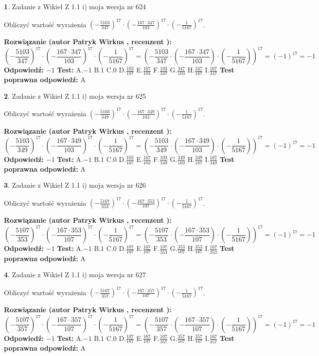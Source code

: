 \documentclass[12pt, a4paper]{article}
\theoremstyle{definition} %
\newtheorem{zad}{}
\newcommand{\zadStart}[1]{\begin{zad}#1\newline}
\newcommand{\zadStop}{\end{zad}}
\newcommand{\rozwStart}[2]{\noindent \textbf{Rozwiązanie (autor #1 , recenzent #2): }\newline}
\newcommand{\rozwStop}{\newline}
\newcommand{\odpStart}{\noindent \textbf{Odpowiedź:}\newline}
\newcommand{\odpStop}{\newline}
\newcommand{\testStart}{\noindent \textbf{Test:}\newline}
\newcommand{\testStop}{\newline}
\newcommand{\kluczStart}{\noindent \textbf{Test poprawna odpowiedź:}\newline}
\newcommand{\kluczStop}{\newline}
\begin{document}
\zadStart{Zadanie z Wikieł Z 1.1 i) moja wersja nr 624}

Obliczyć wartość wyrażenia $(-\frac{5103}{347})^{17} \cdot (-\frac{167 \cdot 347}{103})^{17} \cdot (-\frac{1}{5167})^{17}$.
\zadStop
\rozwStart{Patryk Wirkus}{}
$$(-\frac{5103}{347})^{17} \cdot (-\frac{167 \cdot 347}{103})^{17} \cdot (-\frac{1}{5167})^{17} = (-\frac{5103}{347} \cdot (-\frac{167 \cdot 347}{103}) \cdot (-\frac{1}{5167}))^{17} = (-1)^{17} = -1$$
\rozwStop
\odpStart
$-1$
\odpStop
\testStart
A.$-1$ B.$1$ C.$0$ D.$\frac{103}{167}$ E.$\frac{167}{103}$
F.$\frac{103}{347}$ G.$\frac{347}{103}$
H.$\frac{347}{167}$
I.$\frac{167}{347}$
\testStop
\kluczStart
A
\kluczStop



\zadStart{Zadanie z Wikieł Z 1.1 i) moja wersja nr 625}

Obliczyć wartość wyrażenia $(-\frac{5103}{349})^{17} \cdot (-\frac{167 \cdot 349}{103})^{17} \cdot (-\frac{1}{5167})^{17}$.
\zadStop
\rozwStart{Patryk Wirkus}{}
$$(-\frac{5103}{349})^{17} \cdot (-\frac{167 \cdot 349}{103})^{17} \cdot (-\frac{1}{5167})^{17} = (-\frac{5103}{349} \cdot (-\frac{167 \cdot 349}{103}) \cdot (-\frac{1}{5167}))^{17} = (-1)^{17} = -1$$
\rozwStop
\odpStart
$-1$
\odpStop
\testStart
A.$-1$ B.$1$ C.$0$ D.$\frac{103}{167}$ E.$\frac{167}{103}$
F.$\frac{103}{349}$ G.$\frac{349}{103}$
H.$\frac{349}{167}$
I.$\frac{167}{349}$
\testStop
\kluczStart
A
\kluczStop



\zadStart{Zadanie z Wikieł Z 1.1 i) moja wersja nr 626}

Obliczyć wartość wyrażenia $(-\frac{5107}{353})^{17} \cdot (-\frac{167 \cdot 353}{107})^{17} \cdot (-\frac{1}{5167})^{17}$.
\zadStop
\rozwStart{Patryk Wirkus}{}
$$(-\frac{5107}{353})^{17} \cdot (-\frac{167 \cdot 353}{107})^{17} \cdot (-\frac{1}{5167})^{17} = (-\frac{5107}{353} \cdot (-\frac{167 \cdot 353}{107}) \cdot (-\frac{1}{5167}))^{17} = (-1)^{17} = -1$$
\rozwStop
\odpStart
$-1$
\odpStop
\testStart
A.$-1$ B.$1$ C.$0$ D.$\frac{107}{167}$ E.$\frac{167}{107}$
F.$\frac{107}{353}$ G.$\frac{353}{107}$
H.$\frac{353}{167}$
I.$\frac{167}{353}$
\testStop
\kluczStart
A
\kluczStop



\zadStart{Zadanie z Wikieł Z 1.1 i) moja wersja nr 627}

Obliczyć wartość wyrażenia $(-\frac{5107}{357})^{17} \cdot (-\frac{167 \cdot 357}{107})^{17} \cdot (-\frac{1}{5167})^{17}$.
\zadStop
\rozwStart{Patryk Wirkus}{}
$$(-\frac{5107}{357})^{17} \cdot (-\frac{167 \cdot 357}{107})^{17} \cdot (-\frac{1}{5167})^{17} = (-\frac{5107}{357} \cdot (-\frac{167 \cdot 357}{107}) \cdot (-\frac{1}{5167}))^{17} = (-1)^{17} = -1$$
\rozwStop
\odpStart
$-1$
\odpStop
\testStart
A.$-1$ B.$1$ C.$0$ D.$\frac{107}{167}$ E.$\frac{167}{107}$
F.$\frac{107}{357}$ G.$\frac{357}{107}$
H.$\frac{357}{167}$
I.$\frac{167}{357}$
\testStop
\kluczStart
A
\kluczStop
\end{document}
